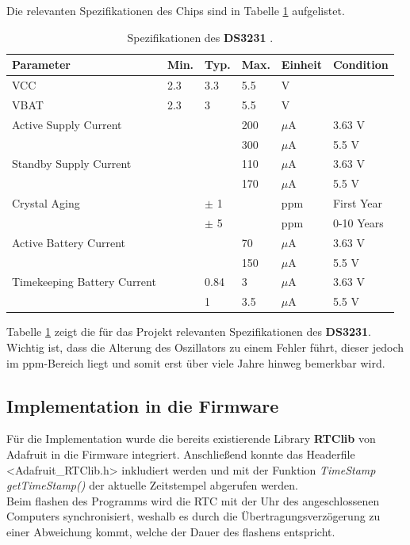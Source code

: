 \newpage
Die relevanten Spezifikationen des Chips sind in Tabelle \ref{tab:DS3231} aufgelistet.\\

\begin{table}[h]
\begin{tabular}{llllll}
\hline 
\textbf{Parameter} & \textbf{Min.} & \textbf{Typ.} & \textbf{Max.} & \textbf{Einheit} & \textbf{Condition} \\ 
\hline 
VCC & 2.3 & 3.3 & 5.5 & V &  \\ 
VBAT & 2.3 & 3 & 5.5 & V &  \\ 
Active Supply Current &  &  & 200 & $\mu$A & 3.63 V \\ 
 &  &  & 300 & $\mu$A & 5.5 V \\ 
Standby Supply Current &  & & 110 & $\mu$A & 3.63 V \\ 
 &  &  & 170 & $\mu$A & 5.5 V \\ 
Crystal Aging &  & $\pm$ 1 &  & ppm & First Year \\ 
 &  & $\pm$ 5 &  & ppm & 0-10 Years \\ 
Active Battery Current &  &  & 70 & $\mu$A & 3.63 V \\ 
 &  &  & 150 & $\mu$A & 5.5 V \\ 
Timekeeping Battery Current &  & 0.84 & 3 & $\mu$A & 3.63 V \\ 
 &  & 1 & 3.5 & $\mu$A & 5.5 V \\ 
\hline 
\end{tabular} 
\caption{Spezifikationen des \textbf{DS3231} \cite{DS3231DS}.}
\label{tab:DS3231}
\end{table}

Tabelle \ref{tab:DS3231} zeigt die für das Projekt relevanten Spezifikationen des \textbf{DS3231}. Wichtig ist, dass die Alterung des Oszillators zu einem Fehler führt, dieser jedoch im ppm-Bereich liegt und somit erst über viele Jahre hinweg bemerkbar wird.

\subsection{Implementation in die Firmware}
Für die Implementation wurde die bereits existierende Library \textbf{RTClib} von Adafruit in die Firmware integriert. Anschließend konnte das Headerfile <Adafruit\_RTClib.h> inkludiert werden und mit der Funktion \textit{TimeStamp getTimeStamp()} der aktuelle Zeitstempel abgerufen werden. \\
Beim flashen des Programms wird die RTC mit der Uhr des angeschlossenen Computers synchronisiert, weshalb es durch die Übertragungsverzögerung zu einer Abweichung kommt, welche der Dauer des flashens entspricht.